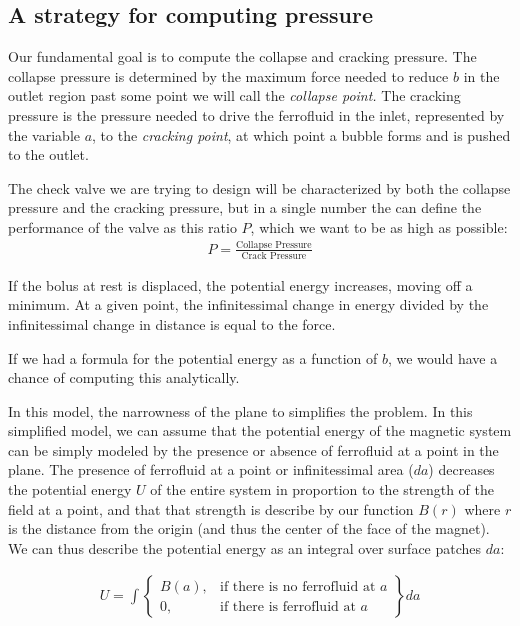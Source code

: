 \documentclass{asme2ej}
\begin{document}
\subsection{A strategy for computing pressure}

Our fundamental goal is to compute the collapse and cracking
pressure. The collapse pressure is determined by the maximum force needed
to reduce $b$ in the outlet region past some point we will call the
{\em collapse point.}
The cracking pressure is the pressure needed to drive the ferrofluid in the inlet,
represented
by the variable $a$, to the {\em cracking point}, at which point
a bubble forms and is pushed to the outlet.

The check valve we are trying to design will be characterized by
both the collapse pressure and the cracking pressure, but in a single
number the can define the performance of the valve as this ratio $P$,
which we want to be as high as possible:
\begin{align}
  P = \frac{\text{Collapse Pressure}}{\text{Crack Pressure}}
  \end{align}

If the bolus at rest is displaced, the potential energy increases,
moving off a minimum. At a given point, the infinitessimal change
in energy divided by the infinitessimal change in distance
is equal to the force.

If we had a formula for the potential energy as a function of $b$,
we would have a chance of computing this analytically.

In this model,  the narrowness of the plane to simplifies
the problem. In this simplified model, we can assume
that the potential energy of the magnetic system can be simply
modeled by the presence or absence of ferrofluid at a point in the plane.
The presence of ferrofluid at a point or infinitessimal area ($da$) decreases the potential energy $U$
of the entire system in proportion to the strength of the field at a point,
and that that strength is describe by our function $B(r)$ where $r$ is the
distance from the origin (and thus the center of the face of the magnet).
We can thus describe the potential energy as an integral over surface patches $da$:

\begin{align}
  U = \int
\left\{
    \begin{array}{lr}
      B(a)  , & \text{if there is no ferrofluid at } a \\
      0 , & \text{if there is ferrofluid at } a
    \end{array}
\right\} da
\end{align}
\end{document}
